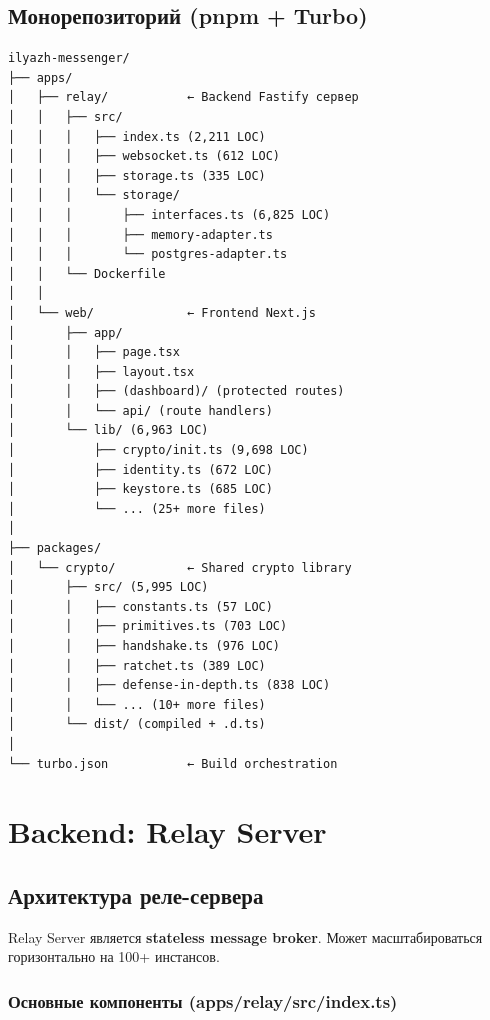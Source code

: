 \documentclass[11pt,a4paper,oneside]{book}
\begin{document}
\vspace{-0.3cm}\section{Монорепозиторий (pnpm + Turbo)}
\begin{verbatim}
ilyazh-messenger/
├── apps/
│   ├── relay/           ← Backend Fastify сервер
│   │   ├── src/
│   │   │   ├── index.ts (2,211 LOC)
│   │   │   ├── websocket.ts (612 LOC)
│   │   │   ├── storage.ts (335 LOC)
│   │   │   └── storage/
│   │   │       ├── interfaces.ts (6,825 LOC)
│   │   │       ├── memory-adapter.ts
│   │   │       └── postgres-adapter.ts
│   │   └── Dockerfile
│   │
│   └── web/             ← Frontend Next.js
│       ├── app/
│       │   ├── page.tsx
│       │   ├── layout.tsx
│       │   ├── (dashboard)/ (protected routes)
│       │   └── api/ (route handlers)
│       └── lib/ (6,963 LOC)
│           ├── crypto/init.ts (9,698 LOC)
│           ├── identity.ts (672 LOC)
│           ├── keystore.ts (685 LOC)
│           └── ... (25+ more files)
│
├── packages/
│   └── crypto/          ← Shared crypto library
│       ├── src/ (5,995 LOC)
│       │   ├── constants.ts (57 LOC)
│       │   ├── primitives.ts (703 LOC)
│       │   ├── handshake.ts (976 LOC)
│       │   ├── ratchet.ts (389 LOC)
│       │   ├── defense-in-depth.ts (838 LOC)
│       │   └── ... (10+ more files)
│       └── dist/ (compiled + .d.ts)
│
└── turbo.json           ← Build orchestration
\end{verbatim}
\vspace{-0.5cm}\chapter{Backend: Relay Server}
\vspace{-0.3cm}\section{Архитектура реле-сервера}
Relay Server является \textbf{stateless message broker}. Может масштабироваться горизонтально на 100+ инстансов.
\vspace{-0.2cm}\subsection{Основные компоненты (apps/relay/src/index.ts)}
\end{document}
